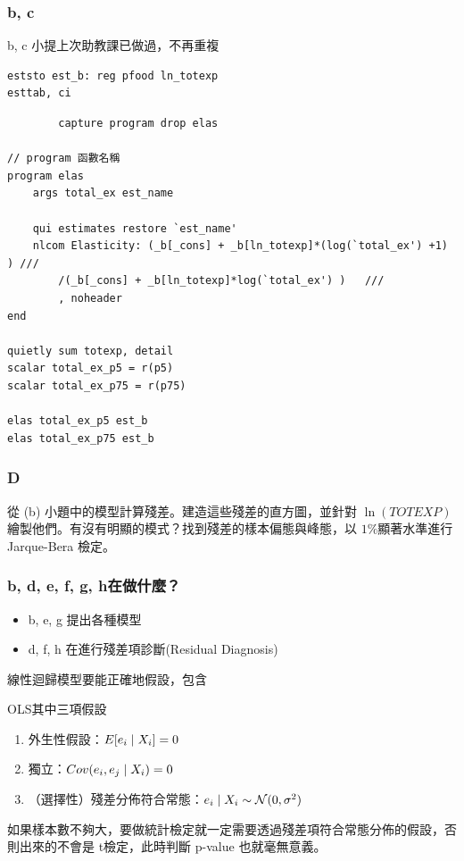 \begin{frame}
    \frametitle{b, c}
    b, c 小提上次助教課已做過，不再重複
    \begin{lstlisting}
eststo est_b: reg pfood ln_totexp
esttab, ci
    \end{lstlisting}

    \begin{lstlisting}
        capture program drop elas

// program 函數名稱
program elas
    args total_ex est_name

    qui estimates restore `est_name'    
    nlcom Elasticity: (_b[_cons] + _b[ln_totexp]*(log(`total_ex') +1) ) ///
        /(_b[_cons] + _b[ln_totexp]*log(`total_ex') )   ///
        , noheader
end

quietly sum totexp, detail
scalar total_ex_p5 = r(p5)
scalar total_ex_p75 = r(p75)

elas total_ex_p5 est_b
elas total_ex_p75 est_b
    \end{lstlisting}
\end{frame}

\begin{frame}
    \frametitle{D}
    從 (b) 小題中的模型計算殘差。建造這些殘差的直方圖，並針對 $\ln(TOTEXP)$繪製他們。有沒有明顯的模式？找到殘差的樣本偏態與峰態，以 $1\%$顯著水準進行 Jarque-Bera 檢定。
\end{frame}

\begin{frame}
    \frametitle{b, d, e, f, g, h在做什麼？}
    \begin{itemize}
        \item b, e, g 提出各種模型
        \item d, f, h 在進行殘差項診斷(Residual Diagnosis)
    \end{itemize}

    線性迴歸模型要能正確地假設，包含
    \begin{block}{OLS其中三項假設}
        \begin{enumerate}
            \item 外生性假設：$E[e_i \mid X_i] = 0$
            \item 獨立：$Cov(e_i, e_j \mid X_i) = 0$
            \item （選擇性）殘差分佈符合常態：$e_i \mid X_i  \sim \mathcal{N}(0, \sigma^2)$
        \end{enumerate}
    \end{block}

    如果樣本數不夠大，要做統計檢定就一定需要透過殘差項符合常態分佈的假設，否則出來的不會是 t檢定，此時判斷 p-value 也就毫無意義。
\end{frame}